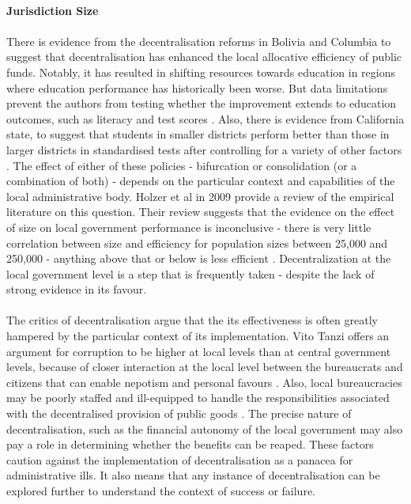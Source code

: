 \documentclass[12pt, a4paper]{article}
\begin{document}
\paragraph{Jurisdiction Size}

\paragraph{} There is evidence from the decentralisation reforms in Bolivia and Columbia to suggest that decentralisation has enhanced the local allocative efficiency of public funds. Notably, it has resulted in shifting resources towards education in regions where education performance has historically been worse. But data limitations prevent the authors from testing whether the improvement extends to education outcomes, such as literacy and test scores \parencite{faguet2008decentralization}. Also, there is evidence from California state, to suggest that students in smaller districts perform better than those in larger districts in standardised tests after controlling for a variety of other factors \parencite{driscoll2003school}. The effect of either of these policies - bifurcation or consolidation (or a combination of both) - depends on the particular context and capabilities of the local administrative body. Holzer et al in 2009 provide a review of the empirical literature on this question. Their review suggests that the evidence on the effect of size on local government performance is inconclusive - there is very little correlation between size and efficiency for population sizes between 25,000 and 250,000 - anything above that or below is less efficient \parencite{holzer2009literature}. Decentralization at the local government level is a step that is frequently taken - despite the lack of strong evidence in its favour. 

\paragraph{} The critics of decentralisation argue that the its effectiveness is often greatly hampered by the particular context of its implementation. Vito Tanzi offers an argument for corruption to be higher at local levels than at central government levels, because of closer interaction at the local level between the bureaucrats and citizens that can enable nepotism and personal favours \parencite{tanzi1996macroeconomic}. Also, local bureaucracies may be poorly staffed and ill-equipped to handle the responsibilities associated with the decentralised provision of public goods \parencite{prud1995dangers}. The precise nature of decentralisation, such as the financial autonomy of the local government may also pay a role in determining whether the benefits can be reaped. These factors caution against the implementation of decentralisation as a panacea for administrative ills. It also means that any instance of decentralisation can be explored further to understand the context of success or failure.
\end{document}
